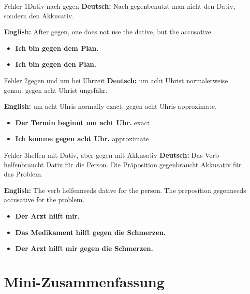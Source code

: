 \documentclass[a4paper,11pt]{article}
\newcommand{\GermanText}[1]{\textbf{Deutsch: }#1\par}
\newcommand{\EnglishText}[1]{{\small\color{SoftGray}\textbf{English: }#1\par}}
\newcommand{\Correct}[1]{\textcolor{HeaderBlueDark}{\textbf{#1}}}
\newcommand{\Wrong}[1]{\textcolor{red!70!black}{\textbf{#1}}}
\begin{document}
\begin{grammarentry}{Fehler 1}{Dativ nach gegen}
\GermanText{Nach \glqq gegen\grqq benutzt man nicht den Dativ, sondern den Akkusativ.}
\EnglishText{After \glqq gegen\grqq, one does not use the dative, but the accusative.}
\begin{itemize}
    \item \Wrong{Ich bin gegen dem Plan.}
    \item \Correct{Ich bin gegen den Plan.}
\end{itemize}
\end{grammarentry}

\begin{grammarentry}{Fehler 2}{gegen und um bei Uhrzeit}
\GermanText{\glqq um acht Uhr\grqq ist normalerweise genau. \glqq gegen acht Uhr\grqq ist ungefähr.}
\EnglishText{\glqq um acht Uhr\grqq is normally exact. \glqq gegen acht Uhr\grqq is approximate.}
\begin{itemize}
    \item \Correct{Der Termin beginnt um acht Uhr.} \hfill exact
    \item \Correct{Ich komme gegen acht Uhr.} \hfill approximate
\end{itemize}
\end{grammarentry}

\begin{grammarentry}{Fehler 3}{helfen mit Dativ, aber gegen mit Akkusativ}
\GermanText{Das Verb \glqq helfen\grqq braucht Dativ für die Person. Die Präposition \glqq gegen\grqq braucht Akkusativ für das Problem.}
\EnglishText{The verb \glqq helfen\grqq needs dative for the person. The preposition \glqq gegen\grqq needs accusative for the problem.}
\begin{itemize}
    \item \Correct{Der Arzt hilft mir.}
    \item \Correct{Das Medikament hilft gegen die Schmerzen.}
    \item \Correct{Der Arzt hilft mir gegen die Schmerzen.}
\end{itemize}
\end{grammarentry}

\section{Mini-Zusammenfassung}
\end{document}
